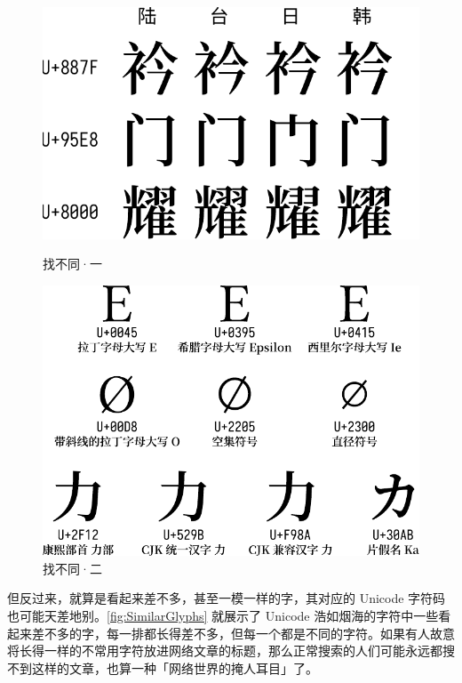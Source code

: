 \begin{figure}[htb!]
  \centering
  \begin{minipage}{.46\textwidth}
    \centering
    \includegraphics[width=.99\textwidth]{assets/advanced/CJK.pdf}
    \caption{找不同·一}
    \label{fig:CJK_same_char}
  \end{minipage}
  \begin{minipage}{.53\textwidth}
    \centering
    \includegraphics[width=.99\textwidth]{assets/advanced/SimilarGlyphs.pdf}
    \caption{找不同·二}
    \label{fig:SimilarGlyphs}
  \end{minipage}
\end{figure}

但反过来，就算是看起来差不多，甚至一模一样的字，其对应的 Unicode 字符码也可能天差地别。\autoref{fig:SimilarGlyphs} 就展示了 Unicode 浩如烟海的字符中一些看起来差不多的字，每一排都长得差不多，但每一个都是不同的字符。如果有人故意将长得一样的不常用字符放进网络文章的标题，那么正常搜索的人们可能永远都搜不到这样的文章，也算一种「网络世界的掩人耳目」了。

